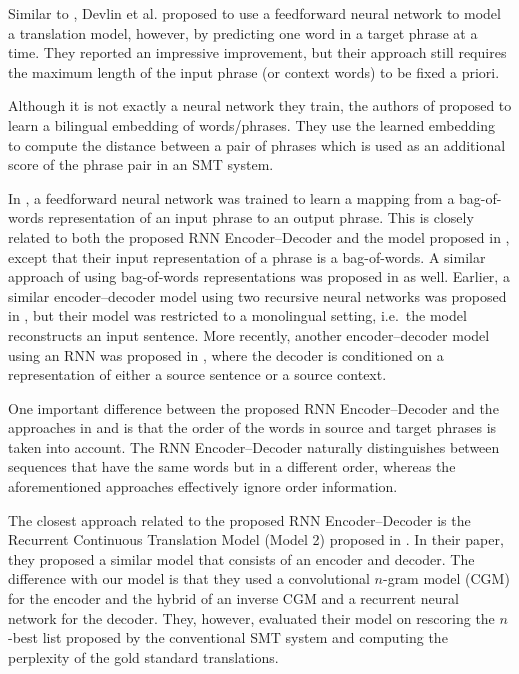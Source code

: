 Similar to \mbox{\cite{Schwenk2012}}, Devlin et al. \mbox{\cite{Devlin2014}}
proposed to use a feedforward neural network to model a translation model,
however, by predicting one word in a target phrase at a time. They reported an
impressive improvement, but their approach still requires the maximum length of
the input phrase (or context words) to be fixed a priori.

Although it is not exactly a neural network they train, the authors of
\mbox{\cite{Zou2013}} proposed to learn a bilingual embedding of words/phrases.
They use the learned embedding to compute the distance between a pair of phrases
which is used as an additional score of the phrase pair in an SMT system.

In \mbox{\cite{Chandar2014}}, a feedforward neural network was trained to learn
a mapping from a bag-of-words representation of an input phrase to an output
phrase. This is closely related to both the proposed RNN Encoder--Decoder and
the model proposed in \mbox{\cite{Schwenk2012}}, except that their input
representation of a phrase is a bag-of-words. A similar approach of using
bag-of-words representations was proposed in \cite{Gao2013} as well.  Earlier,
a similar encoder--decoder model using two recursive neural networks was
proposed in \mbox{\cite{SocherEtAl2011:PoolRAE}}, but their model was
restricted to a monolingual setting, i.e.\ the model reconstructs an input
sentence. More recently, another encoder--decoder model using an RNN was
proposed in \cite{Auli2013}, where the decoder is conditioned on a
representation of either a source sentence or a source context.

One important difference between the proposed RNN Encoder--Decoder and the
approaches in \mbox{\cite{Zou2013}} and \mbox{\cite{Chandar2014}} is that the
order of the words in source and target phrases is taken into account. The RNN
Encoder--Decoder naturally distinguishes between sequences that have the same
words but in a different order, whereas the aforementioned approaches
effectively ignore order information.

The closest approach related to the proposed RNN Encoder--Decoder is the
Recurrent Continuous Translation Model (Model 2) proposed in
\mbox{\cite{Kalchbrenner2012}}. In their paper, they proposed a similar model
that consists of an encoder and decoder. The difference with our model is that
they used a convolutional $n$-gram model (CGM) for the encoder and the hybrid of
an inverse CGM and a recurrent neural network for the decoder. They, however,
evaluated their model on rescoring the $n$-best list proposed by the
conventional SMT system and computing the perplexity of the gold standard
translations.

